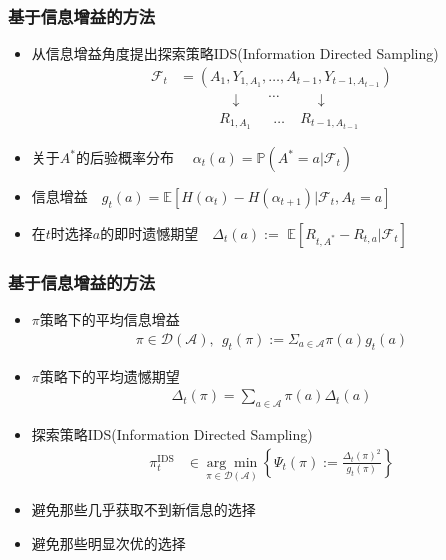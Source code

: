 \documentclass{beamer}
\begin{document}
\begin{CJK*}{GBK}{hei}
\begin{frame}\frametitle{基于信息增益的方法}
\begin{itemize}
\item \citep{Russo2014LearningTO}从信息增益角度提出探索策略IDS(Information Directed Sampling)
\begin{align*}
\mathscr{F}_{t}&=\left(A_{1}, Y_{1, A_{1}}, \ldots, A_{t-1}, Y_{t-1, A_{t-1}}\right)\\
                        &~~~~~~~~~~~~~~~~\downarrow~~~~~~~~\dots~~~~~~~~~~~\downarrow\\
                        &~~~~~~~~~~~~~R_{1,A_1}~~~~~~~\dots~~~~~R_{t-1,A_{t-1}}
\end{align*}
\item 关于$A^{*}$的后验概率分布~~ $\alpha_{t}(a)=\mathbb{P}\left(A^{*}=a \vert \mathscr{F}_{t}\right)$
\item 信息增益~~$g_{t}(a)=\mathbb{E}\left[H\left(\alpha_{t}\right)-H\left(\alpha_{t+1}\right) \vert \mathscr{F}_{t}, A_{t}=a\right]$
\item 在$t$时选择$a$的即时遗憾期望~~$\Delta_{t}(a):=$ $\mathbb{E}\left[R_{t, A^{*}}-R_{t, a} \vert \mathscr{F}_{t}\right]$
\end{itemize}
\end{frame}

\begin{frame}\frametitle{基于信息增益的方法}
\begin{itemize}
\item $\pi$策略下的平均信息增益
\begin{align*}
    \pi \in \mathscr{D}(\mathscr{A}), ~~ g_{t}(\pi):=\Sigma_{a \in \mathscr{A}} \pi(a) g_{t}(a)
\end{align*}
\item $\pi$策略下的平均遗憾期望
\begin{align*}
    \Delta_{t}(\pi)=\sum_{a \in \mathscr{A}} \pi(a) \Delta_{t}(a)
\end{align*}
\item 探索策略IDS(Information Directed Sampling)
\begin{align*}
    \pi_{t}^{\mathrm{IDS}} &\in \underset{\pi \in \mathcal{D}(\mathscr{A})}{\arg \min }\left\{\Psi_{t}(\pi):=\frac{\Delta_{t}(\pi)^{2}}{g_{t}(\pi)}\right\}
\end{align*}
\item 避免那些几乎获取不到新信息的选择
\item 避免那些明显次优的选择
\end{itemize}
\end{frame}


\end{CJK*}
\end{document}
